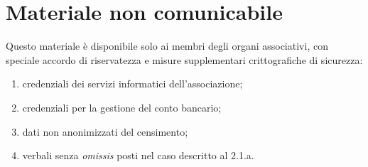 \section{Materiale non comunicabile}\label{materiale-non-comunicabile}

Questo materiale è disponibile solo ai membri degli organi associativi,
con speciale accordo di riservatezza e misure supplementari
crittografiche di sicurezza:

\begin{enumerate}
    \item
        credenziali dei servizi informatici dell'associazione;
    \item
        credenziali per la gestione del conto bancario;
    \item
        dati non anonimizzati del censimento;
    \item
        verbali senza \emph{omissis} posti nel caso descritto al 2.1.a.
\end{enumerate}
